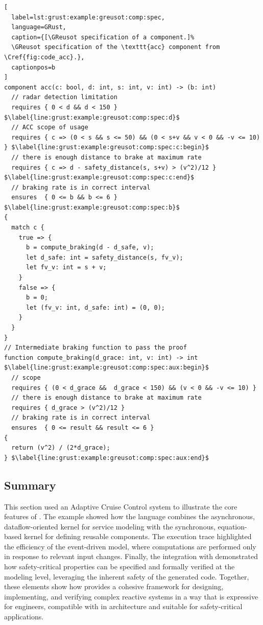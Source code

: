 \begin{lstlisting}[
  label=lst:grust:example:greusot:comp:spec,
  language=GRust, 
  caption={[\GReusot specification of a component.]%
  \GReusot specification of the \texttt{acc} component from \Cref{fig:code_acc}.},
  captionpos=b
]
component acc(c: bool, d: int, s: int, v: int) -> (b: int)
  // radar detection limitation
  requires { 0 < d && d < 150 } $\label{line:grust:example:greusot:comp:spec:d}$
  // ACC scope of usage
  requires { c => (0 < s && s <= 50) && (0 < s+v && v < 0 && -v <= 10) } $\label{line:grust:example:greusot:comp:spec:c:begin}$
  // there is enough distance to brake at maximum rate
  requires { c => d - safety_distance(s, s+v) > (v^2)/12 } $\label{line:grust:example:greusot:comp:spec:c:end}$
  // braking rate is in correct interval
  ensures  { 0 <= b && b <= 6 } $\label{line:grust:example:greusot:comp:spec:b}$
{
  match c {
    true => {
      b = compute_braking(d - d_safe, v);
      let d_safe: int = safety_distance(s, fv_v);
      let fv_v: int = s + v;
    }
    false => {
      b = 0;
      let (fv_v: int, d_safe: int) = (0, 0);
    }
  }
}
// Intermediate braking function to pass the proof
function compute_braking(d_grace: int, v: int) -> int $\label{line:grust:example:greusot:comp:spec:aux:begin}$
  // scope
  requires { (0 < d_grace &&  d_grace < 150) && (v < 0 && -v <= 10) }
  // there is enough distance to brake at maximum rate
  requires { d_grace > (v^2)/12 }
  // braking rate is in correct interval
  ensures  { 0 <= result && result <= 6 }
{
  return (v^2) / (2*d_grace);
} $\label{line:grust:example:greusot:comp:spec:aux:end}$
\end{lstlisting}

\subsection{Summary}
This section used an Adaptive Cruise Control system to illustrate the core features of \GRust. The
example showed how the language combines the asynchronous, dataflow-oriented \GRFRP kernel for
service modeling with the synchronous, equation-based \GRSync kernel for defining reusable
components. The execution trace highlighted the efficiency of the event-driven model, where
computations are performed only in response to relevant input changes. Finally, the integration with
\GReusot demonstrated how safety-critical properties can be specified and formally verified at the
modeling level, leveraging the inherent safety of the generated \Rust code. Together, these elements
show how \GRust provides a cohesive framework for designing, implementing, and verifying complex
reactive systems in a way that is expressive for engineers, compatible with  in \sdv architecture
and suitable for safety-critical applications.
